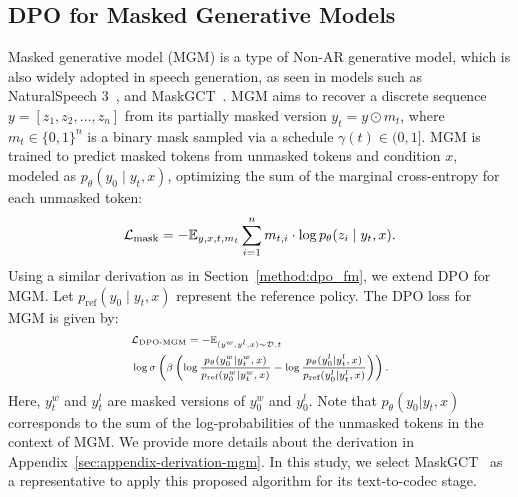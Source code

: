 \documentclass[11pt]{article}
\begin{document}
\subsection{DPO for Masked Generative Models}
\label{method:dpo_mgm}
Masked generative model (MGM) is a type of Non-AR generative model, which is also widely adopted in speech generation, as seen in models such as NaturalSpeech 3~\cite{naturalspeech3}, and MaskGCT~\cite{maskgct}. MGM aims to recover a discrete sequence \(y = [z_1, z_2, \ldots, z_n]\) from its partially masked version \(y_t = y \odot m_t\), where \(m_t \in \{0,1\}^n\) is a binary mask sampled via a schedule \(\gamma(t) \in (0,1]\). MGM is trained to predict masked tokens from unmasked tokens and condition $x$, modeled as $p_\theta(y_0 \mid y_t, x)$, optimizing the sum of the marginal cross-entropy for each unmasked token:
\vspace{-2mm}
\begin{equation}
\small{
\mathcal{L}_{\text{mask}} = -\mathbb{E}_{y, x, t, m_t} \sum_{i=1}^{n} m_{t,i} \cdot \log p_{\theta}(z_i \mid y_t, x).
}
\end{equation}
Using a similar derivation as in Section~\ref{method:dpo_fm}, we extend DPO for MGM. Let \(p_{\text{ref}}(y_0 \mid y_t, x)\) represent the reference policy. The DPO loss for MGM is given by:
\vspace{-2mm}
\begin{equation}
{\scriptsize
\begin{aligned}
& \mathcal{L}_{\text{DPO-MGM}} = -\mathbb{E}_{(y^w, y^l, x) \sim \mathcal{D}, t}  \\
& \log \sigma \left( \beta \left( \log \frac{p_\theta(y^w_0|y^w_t,x)}{p_{\text{ref}}(y^w_0|y^w_t,x)}
 - \log \frac{p_\theta(y^l_0|y^l_t,x)}{p_{\text{ref}}(y^l_0|y^l_t,x)} \right) \right).
\end{aligned}
}
\end{equation}
Here, \(y^w_t\) and \(y^l_t\) are masked versions of \(y^w_0\) and \(y^l_0\). Note that $p_\theta(y_0|y_t,x)$ corresponds to the sum of the log-probabilities of the unmasked tokens in the context of MGM. We provide more details about the derivation in Appendix~\ref{sec:appendix-derivation-mgm}. In this study, we select MaskGCT~\cite{maskgct} as a representative to apply this proposed algorithm for its text-to-codec stage.
\end{document}
